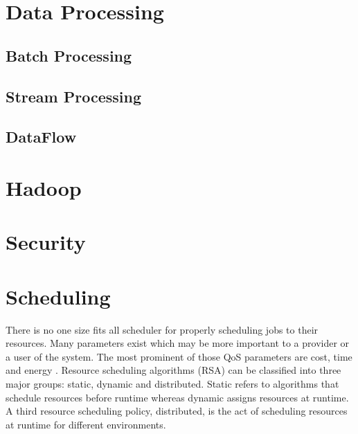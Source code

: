 \documentclass[fullapage,12pt]{article}
\begin{document}









\section{Data Processing} \label{sec:data-processing}


\subsection{Batch Processing} \label{sub:batch}


\subsection{Stream Processing} \label{sub:stream}

\subsection{DataFlow} \label{sub:dataflow}

\section{Hadoop} \label{sec:hadoop}

\section{Security} \label{sec:security}

\cite{liu2015survey}

\section{Scheduling} \label{sec:scheduling}

There is no one size fits all scheduler for properly scheduling jobs to their resources. Many parameters exist which may be more important to a provider or a user of the system. The most prominent of those QoS parameters are cost, time and energy \cite{Singh2016}. Resource scheduling algorithms (RSA) can be classified into three major groups: static, dynamic and distributed. Static refers to algorithms that schedule resources before runtime whereas dynamic assigns resources at runtime. A third resource scheduling policy, distributed, is the act of scheduling resources at runtime for different environments.
\end{document}
